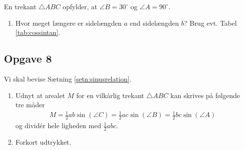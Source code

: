 En trekant $\triangle ABC$ opfylder, at $\angle B = 30^\circ$ og $\angle A = 90^\circ$.
\begin{enumerate}[label=\roman*)]
	\item Hvor meget længere er sidelængden $a$ end sidelængden $b$? Brug evt. Tabel \ref{tab:cossintan}.
\end{enumerate} 

\subsection*{Opgave 8}
Vi skal bevise Sætning \ref{setn:sinusrelation}.
\begin{enumerate}[label=\roman*)]
	\item Udnyt at arealet $M$ for en vilkårlig trekant $\triangle ABC$ kan skrives på følgende tre måder
	\begin{align*}
		M = \frac{1}{2}ab\sin(\angle C) = \frac{1}{2}ac\sin(\angle B) = \frac{1}{2} bc\sin(\angle A)
	\end{align*}
	og dividér hele ligheden med $\frac{1}{2}abc$.
	\item Forkort udtrykket.
\end{enumerate}



